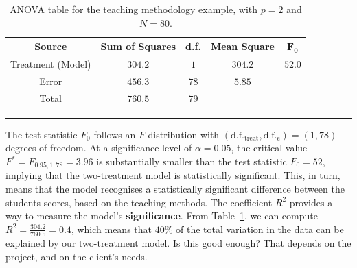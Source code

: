      \begin{table}[!t]
         \centering
         \begin{tabular}{c c c c c}
         \hline
        \textbf{Source} & \textbf{Sum of Squares} & \textbf{d.f.} & \textbf{Mean Square} & $\mathbf{F_{0}}$ \\
         \hline
         Treatment (Model) & $304.2$ & $1$ & $304.2$ & $52.0$\\
         Error & $456.3$ & $78$ & $5.85$\\
         Total & $760.5$ & $79$\\
        \hline
         \end{tabular}
         \caption[\small ANOVA table -- teaching methodology]{\small ANOVA table for the teaching methodology example, with $p=2$ and $N=80$.}
         \label{tab:SA3}\hrule
     \end{table}
The test statistic $F_{0}$ follows an $F$-distribution with $(\text{d.f.}_{\textrm{treat}}, \text{d.f.}_{\textrm{e}})=(1,78)$ degrees of freedom. At a significance level of $\alpha=0.05$, the critical value $F^*=F_{0.95, 1, 78}=3.96$ is substantially smaller than the test statistic $F_{0}=52$, implying that the two-treatment model is statistically significant. This, in turn, means that the model recognises a statistically significant difference between the students scores, based on the teaching methods. 
\newl The coefficient $R^2$ provides a way to measure the model's \textbf{significance}. From Table~\ref{tab:SA3}, we can compute $R^{2}=\frac{304.2}{760.5}=0.4$, which means that $40\%$ of the total variation in the data can be explained by our two-treatment model. Is this good enough? That depends on the project, and on the client's needs.
